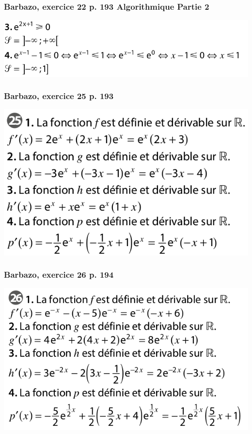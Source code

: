 \documentclass[11pt, hyperref={urlcolor=red,%
            linkcolor=blue, %
            colorlinks=true}]{beamer}
\begin{document}
 

\begin{frame}
\frametitle{Barbazo, exercice 22 p. 193 Algorithmique Partie 2}
\begin{center}
	\includegraphics[scale=0.3]{exo22-Part2.png}
\end{center}

\end{frame}


\begin{frame}
\frametitle{Barbazo, exercice 25 p. 193}
\label{exo25}
\begin{center}
	\includegraphics[scale=0.3]{exo25.png}
\end{center}
\end{frame}

\begin{frame}
\frametitle{Barbazo, exercice 26 p. 194}
\label{exo26}
\begin{center}
	\includegraphics[scale=0.3]{exo26.png}
\end{center}
\end{frame}
\end{document}
